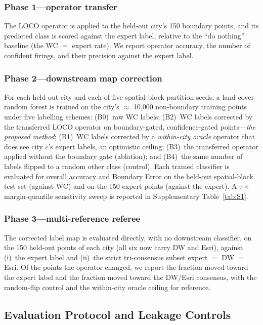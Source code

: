 \subsubsection*{Phase 1---operator transfer}

The LOCO operator is applied to the held-out city's 150 boundary points, and its
predicted class is scored against the expert label, relative to the ``do
nothing'' baseline (the WC $=$ expert rate). We report operator accuracy, the
number of confident firings, and their precision against the expert label.

\subsubsection*{Phase 2---downstream map correction}

For each held-out city and each of five spatial-block partition seeds, a
land-cover random forest is trained on the city's $\approx$ 10,000 non-boundary
training points under five labelling schemes: (B0)~raw WC labels; (B2)~WC labels
corrected by the transferred LOCO operator on boundary-gated, confidence-gated
points---\emph{the proposed method}; (B1)~WC labels corrected by a
\emph{within-city oracle} operator that does see city $c$'s expert labels, an
optimistic ceiling; (B3)~the transferred operator applied without the boundary
gate (ablation); and (B4)~the same number of labels flipped to a random other
class (control). Each trained classifier is evaluated for overall accuracy and
Boundary Error on the held-out spatial-block test set (against WC) and on the
150 expert points (against the expert). A $\tau \times$ margin-quantile
sensitivity sweep is reported in Supplementary Table~\ref{tab:S1}.

\subsubsection*{Phase 3---multi-reference referee}

The corrected label map is evaluated directly, with no downstream classifier, on
the 150 held-out points of each city (all six now carry DW and Esri), against
(i)~the expert label and (ii)~the strict tri-consensus subset expert $=$ DW $=$
Esri. Of the points the operator changed, we report the fraction moved toward
the expert label and the fraction moved toward the DW/Esri consensus, with the
random-flip control and the within-city oracle ceiling for reference.

\subsection{Evaluation Protocol and Leakage Controls}\label{sec:eval}

